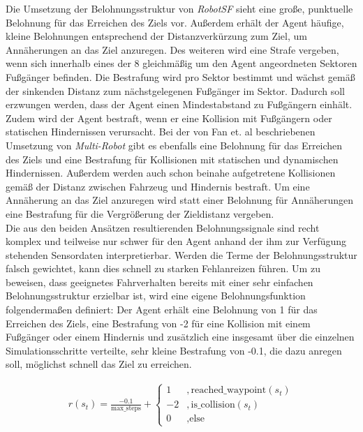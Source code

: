 Die Umsetzung der Belohnungsstruktur von \emph{RobotSF} sieht eine große, punktuelle
Belohnung für das Erreichen des Ziels vor. Außerdem erhält der Agent häufige, kleine
Belohnungen entsprechend der Distanzverkürzung zum Ziel, um Annäherungen an das Ziel
anzuregen. Des weiteren wird eine Strafe vergeben, wenn sich innerhalb eines der 8
gleichmäßig um den Agent angeordneten Sektoren Fußgänger befinden. Die Bestrafung
wird pro Sektor bestimmt und wächst gemäß der sinkenden Distanz zum nächstgelegenen
Fußgänger im Sektor. Dadurch soll erzwungen werden, dass der Agent einen Mindestabstand
zu Fußgängern einhält. Zudem wird der Agent bestraft, wenn er eine Kollision mit
Fußgängern oder statischen Hindernissen verursacht. Bei der von Fan et. al
\cite{fan2020distributed} beschriebenen Umsetzung von \emph{Multi-Robot} gibt es
ebenfalls eine Belohnung für das Erreichen des Ziels und eine Bestrafung für Kollisionen
mit statischen und dynamischen Hindernissen. Außerdem werden auch schon beinahe
aufgetretene Kollisionen gemäß der Distanz zwischen Fahrzeug und Hindernis bestraft.
Um eine Annäherung an das Ziel anzuregen wird statt einer Belohnung für Annäherungen
eine Bestrafung für die Vergrößerung der Zieldistanz vergeben.\\

Die aus den beiden Ansätzen resultierenden Belohnungssignale sind recht komplex und
teilweise nur schwer für den Agent anhand der ihm zur Verfügung stehenden Sensordaten
interpretierbar. Werden die Terme der Belohnungsstruktur falsch gewichtet, kann dies
schnell zu starken Fehlanreizen führen.
Um zu beweisen, dass geeignetes Fahrverhalten bereits mit einer sehr einfachen
Belohnungsstruktur erzielbar ist, wird eine eigene Belohnungsfunktion folgendermaßen
definiert: Der Agent erhält eine Belohnung von 1 für das Erreichen des Ziels, eine
Bestrafung von -2 für eine Kollision mit einem Fußgänger oder einem Hindernis und
zusätzlich eine insgesamt über die einzelnen Simulationsschritte verteilte, sehr kleine
Bestrafung von -0.1, die dazu anregen soll, möglichst schnell das Ziel zu erreichen.

\begin{equation}
\begin{aligned}
r(s_t) = \frac{-0.1}{\text{max\_steps}} + \begin{cases}
1 & , \text{reached\_waypoint}(s_t) \\
-2 & , \text{is\_collision}(s_t) \\
0 & , \text{else}
\end{cases}
\end{aligned}
\end{equation}

